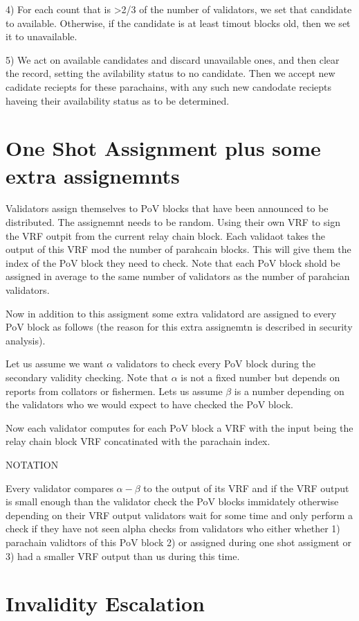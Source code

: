4) For each count that is >2/3 of the number of validators, we set that candidate to available. Otherwise, if the candidate is at least timout blocks old, then we set it to unavailable.

5) We act on available candidates and discard unavailable ones, and then clear the record, setting the avilability status to no candidate. Then we accept new cadidate reciepts for these parachains, with any such new candodate reciepts haveing their availability status as to be determined.



\section{One Shot Assignment plus some extra assignemnts}\label{shot-assignment}
Validators assign themselves to PoV blocks that have been announced to be distributed. The assignemnt needs to be random. Using their own VRF to sign the VRF outpit from the current relay chain block. Each validaot takes the output of this VRF mod the number of parahcain blocks. This will give them the index of the PoV block they need to check. Note that each PoV block shold be assigned in average to the same number of validators as the number of parahcian validators.

Now in addition to this assigment some extra validatord are assigned to every PoV block as follows (the reason for this extra assignemtn is described in security analysis).

Let us assume we want $\alpha$ validators to check every PoV block during the secondary validity checking. Note that $\alpha$ is not a fixed number but depends on reports from collators or fishermen. Lets us assume $\beta$ is a number depending on the validators who we would expect to have checked the PoV block.  


Now each validator computes for each PoV block a VRF with the input being the relay chain block VRF concatinated with the parachain index. 

NOTATION

Every validator compares $\alpha - \beta$ to the output of its VRF and if the VRF output is small enough than the validator check the PoV blocks immidately otherwise depending on their VRF output validators wait for some time and only perform a check if they have not seen alpha checks from validators who either whether 1) parachain validtors of this PoV block 2) or assigned during one shot assigment or 3) had a smaller VRF output than us during this time. 

\section{Invalidity Escalation}\label{escalation}
